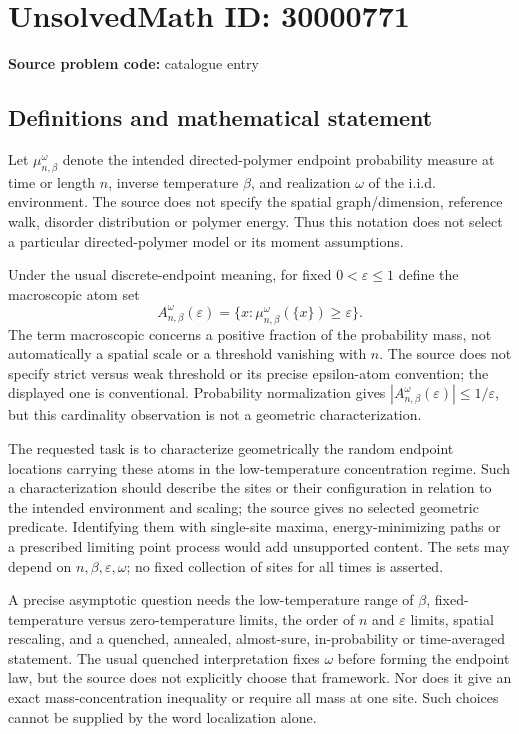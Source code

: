 \documentclass[11pt]{article}
\begin{document}
\section*{UnsolvedMath ID: 30000771}
\textbf{Source problem code:} catalogue entry
\subsection{Definitions and mathematical statement}
Let \(\mu_{n,\beta}^{\omega}\) denote the intended directed-polymer endpoint probability measure at time or length \(n\), inverse temperature \(\beta\), and realization \(\omega\) of the i.i.d. environment. The source does not specify the spatial graph/dimension, reference walk, disorder distribution or polymer energy. Thus this notation does not select a particular directed-polymer model or its moment assumptions.

Under the usual discrete-endpoint meaning, for fixed \(0<\varepsilon\leq1\) define the macroscopic atom set
\[
 A_{n,\beta}^{\omega}(\varepsilon)=
 \{x:\mu_{n,\beta}^{\omega}(\{x\})\geq\varepsilon\}.
\]
The term macroscopic concerns a positive fraction of the probability mass, not automatically a spatial scale or a threshold vanishing with \(n\). The source does not specify strict versus weak threshold or its precise epsilon-atom convention; the displayed one is conventional. Probability normalization gives \(|A_{n,\beta}^{\omega}(\varepsilon)|\leq1/\varepsilon\), but this cardinality observation is not a geometric characterization.

The requested task is to characterize geometrically the random endpoint locations carrying these atoms in the low-temperature concentration regime. Such a characterization should describe the sites or their configuration in relation to the intended environment and scaling; the source gives no selected geometric predicate. Identifying them with single-site maxima, energy-minimizing paths or a prescribed limiting point process would add unsupported content. The sets may depend on \(n,\beta,\varepsilon,\omega\); no fixed collection of sites for all times is asserted.

A precise asymptotic question needs the low-temperature range of \(\beta\), fixed-temperature versus zero-temperature limits, the order of \(n\) and \(\varepsilon\) limits, spatial rescaling, and a quenched, annealed, almost-sure, in-probability or time-averaged statement. The usual quenched interpretation fixes \(\omega\) before forming the endpoint law, but the source does not explicitly choose that framework. Nor does it give an exact mass-concentration inequality or require all mass at one site. Such choices cannot be supplied by the word localization alone.
\end{document}
